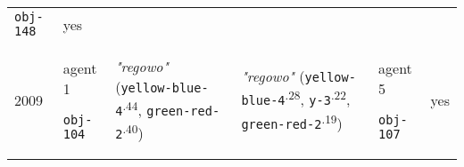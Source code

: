 {\begin{tabular}{@{}p{0.4cm}p{0.85cm}p{6.5cm}p{6.5cm}p{0.85cm}p{0.5cm}@{}}
 \texttt{obj-148} & yes \\
2009 & agent 1 

\texttt{obj-104} &\textit{"regowo"} (\texttt{yellow-blue-4}\textsuperscript{.44}, \texttt{green-red-2}\textsuperscript{.40}) & \textit{"regowo"} (\texttt{yellow-blue-4}\textsuperscript{.28}, \texttt{y-3}\textsuperscript{.22}, \texttt{green-red-2}\textsuperscript{.19}) & agent 5 

 \texttt{obj-107} & yes \\

\end{tabular}}


